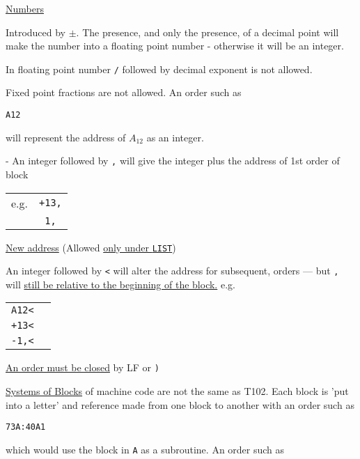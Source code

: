 \documentclass[10pt, a4paper, oneside]{article}
\newcommand{\myuline}[1]{\uline{#1}}
\newcommand{\mytt}[1]{\texttt{\scriptsize #1}}
\newcommand{\mytt}[1]{\texttt{\small #1}}
\begin{document}
\begin{multicols}{2}
\noindent\myuline{Numbers}

Introduced by $\pm$.
The presence, and only the presence, of a decimal
point will make the number into a floating point
number - otherwise it will be an integer.

In floating point number \mytt{/} followed by decimal
exponent is not allowed.

Fixed point fractions are not allowed.
An order such as

\begin{addmargin}[1cm]{1em}%
\begin{lstlisting}
A12
\end{lstlisting}
\end{addmargin}

will represent the address of $A_{12}$ as an integer.

- An integer followed by \mytt{,} will give the integer
plus the address of 1st order of block

\begin{tabular}{ll}
e.g. & \mytt{+13,} \\
     & \mytt{~1,} \\
\end{tabular}

\noindent\myuline{New address} (Allowed \myuline{only under \mytt{LIST}})

An integer followed by \mytt{<} will alter the address
for subsequent, orders — but \mytt{,} will \myuline{still be relative
to the beginning of the block.} e.g.

\begin{tabular}{ll}
\mytt{A12<} \\
\mytt{+13<} \\
\mytt{-1,<} \\
\end{tabular}

\noindent\myuline{An order must be closed} by LF or \mytt{)}

\noindent\myuline{Systems of Blocks} of machine code are not the same as
T102.  Each block is 'put into a letter' and reference
made from one block to another with an order such as

\begin{addmargin}[1cm]{1em}%
\begin{lstlisting}
73A:40A1
\end{lstlisting}
\end{addmargin}

which would use the block in \mytt{A} as a subroutine. An
order such as


\end{multicols}
\end{document}

